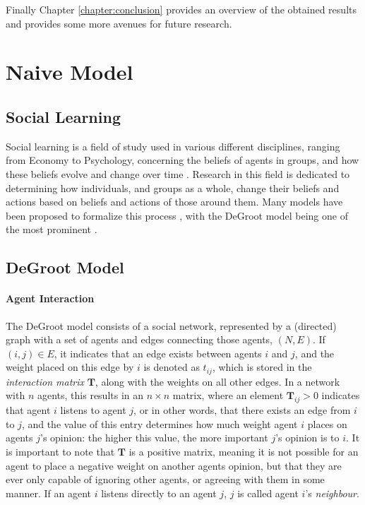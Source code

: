 \documentclass[a4paper, 12pt]{report}
\newcommand{\T}{\bm{T}}
\begin{document}
\noindent Finally Chapter \ref{chapter:conclusion} provides an overview of the obtained results and provides some more avenues for future research.

\chapter{Naive Model}
\label{chapter:model}

\section{Social Learning}
Social learning is a field of study used in various different disciplines, ranging from Economy to Psychology, concerning the beliefs of agents in groups, and how these beliefs evolve and change over time \parencite{reed2010sociallearning}. Research in this field is dedicated to determining how individuals, and groups as a whole, change their beliefs and actions based on beliefs and actions of those around them. Many models have been proposed to formalize this process \parencite{golub2017learning}, with the DeGroot model being one of the most prominent \parencite{degroot1974concensus}.

\section{DeGroot Model}
\subsubsection{Agent Interaction}
\label{interaction:matrix}
The DeGroot model \parencite{degroot1974concensus} consists of a social network, represented by a (directed) graph with a set of agents and edges connecting those agents, $(N, E)$. If $(i,j)\in E$, it indicates that an edge exists between agents $i$ and $j$, and the weight placed on this edge by $i$ is denoted as $t_{ij}$, which is stored in the \emph{interaction matrix} $\T$, along with the weights on all other edges. In a network with $n$ agents, this results in an $n \times n$ matrix, where an element $\T_{ij}>0$ indicates that agent $i$ listens to agent $j$, or in other words, that there exists an edge from $i$ to $j$, and the value of this entry determines how much weight agent $i$ places on agents $j$'s opinion: the higher this value, the more important $j$'s opinion is to $i$. It is important to note that $\T$ is a positive matrix, meaning it is not possible for an agent to place a negative weight on another agents opinion, but that they are ever only capable of ignoring other agents, or agreeing with them in some manner. If an agent $i$ listens directly to an agent $j$, $j$ is called agent $i$'s \emph{neighbour}.
\end{document}
